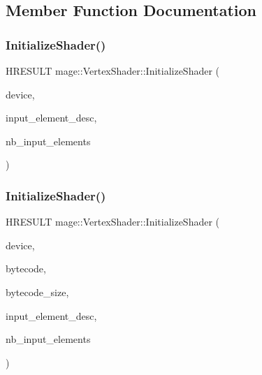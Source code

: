 \subsection{Member Function Documentation}
\hypertarget{classmage_1_1_vertex_shader_afe85ee7cdaba3ce17a1d461bd633be97}{}\label{classmage_1_1_vertex_shader_afe85ee7cdaba3ce17a1d461bd633be97} 
\subsubsection{\texorpdfstring{Initialize\+Shader()}{InitializeShader()}\hspace{0.1cm}{\footnotesize\ttfamily [1/2]}}
{\footnotesize\ttfamily H\+R\+E\+S\+U\+LT mage\+::\+Vertex\+Shader\+::\+Initialize\+Shader (\begin{DoxyParamCaption}\item[{I\+D3\+D11\+Device2 \&}]{device,  }\item[{const D3\+D11\+\_\+\+I\+N\+P\+U\+T\+\_\+\+E\+L\+E\+M\+E\+N\+T\+\_\+\+D\+E\+SC $\ast$}]{input\+\_\+element\+\_\+desc,  }\item[{uint32\+\_\+t}]{nb\+\_\+input\+\_\+elements }\end{DoxyParamCaption})\hspace{0.3cm}{\ttfamily [private]}}

\hypertarget{classmage_1_1_vertex_shader_ab2481ea7e51cd41e74cf1394f14f43e1}{}\label{classmage_1_1_vertex_shader_ab2481ea7e51cd41e74cf1394f14f43e1} 
\subsubsection{\texorpdfstring{Initialize\+Shader()}{InitializeShader()}\hspace{0.1cm}{\footnotesize\ttfamily [2/2]}}
{\footnotesize\ttfamily H\+R\+E\+S\+U\+LT mage\+::\+Vertex\+Shader\+::\+Initialize\+Shader (\begin{DoxyParamCaption}\item[{I\+D3\+D11\+Device2 \&}]{device,  }\item[{const void $\ast$}]{bytecode,  }\item[{S\+I\+Z\+E\+\_\+T}]{bytecode\+\_\+size,  }\item[{const D3\+D11\+\_\+\+I\+N\+P\+U\+T\+\_\+\+E\+L\+E\+M\+E\+N\+T\+\_\+\+D\+E\+SC $\ast$}]{input\+\_\+element\+\_\+desc,  }\item[{uint32\+\_\+t}]{nb\+\_\+input\+\_\+elements }\end{DoxyParamCaption})\hspace{0.3cm}{\ttfamily [private]}}

